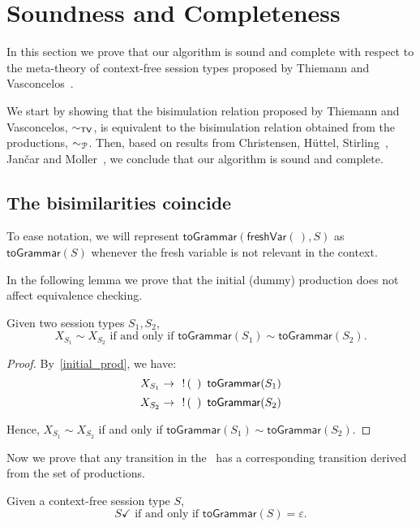 \section{Soundness and Completeness}
\label{sec:soundness}

In this section we prove that our algorithm is sound and complete 
with respect to the meta-theory of context-free session types proposed 
by Thiemann and Vasconcelos~\cite{thiemann2016context}.

We start by showing that the bisimulation relation proposed by 
Thiemann and Vasconcelos, $\sim_{\mathsf{TV}}$, is equivalent to the 
bisimulation relation obtained from the productions, $\sim_{\mathcal{P}}$. 
Then, based on results from Christensen, H{\"{u}}ttel, 
Stirling~\cite{DBLP:journals/iandc/ChristensenHS95}, Jan{\v{c}}ar 
and Moller~\cite{janvcar1999techniques}, we conclude that our algorithm 
is sound and complete.

\subsection{The bisimilarities coincide}

To ease notation, we will represent $\mathsf{toGrammar}
(\mathsf{freshVar}(\,),S)$ as $\mathsf{toGrammar}(S)$ whenever 
the fresh variable is not relevant in the context.

In the following lemma we prove that the initial (dummy) production 
does not affect equivalence checking.
\begin{lemma}
	Given two session types $S_1, S_2$, 
	\[ X_{S_1} \sim X_{S_2}  \text{ if and only if } 
	\mathsf{toGrammar}(S_1) \sim \mathsf{toGrammar}(S_2).\]
\end{lemma}

\begin{proof}
	By~\eqref{initial_prod}, we have:
	\[ X_{S_1}  \rightarrow \enspace \,!\, ( \enspace )\enspace \mathsf{toGrammar}(S_1) 	\]
    \[ X_{S_2}  \rightarrow \enspace \,!\, ( \enspace )\enspace \mathsf{toGrammar}(S_2) 	\]

Hence, $X_{S_1}\sim X_{S_2}$ if and only if 
$\mathsf{toGrammar}(S_1) \sim \mathsf{toGrammar}(S_2)$.
\end{proof}

Now we prove that any transition in the \LTS\ has a 
corresponding transition derived from the set of productions.

\begin{lemma}
\label{lemma:terminated_session}
	Given a context-free session type $S$, 
	\[S \checkmark \text{ if and only if } \mathsf{toGrammar}(S) = \varepsilon.\]
\end{lemma}


